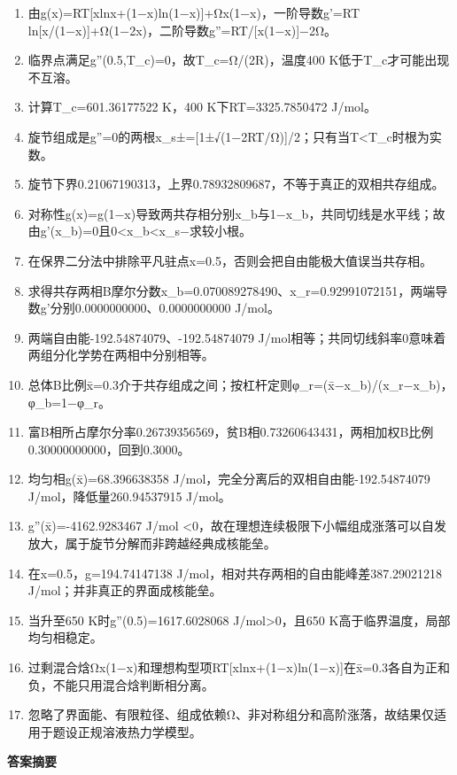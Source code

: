 \documentclass[UTF8,11pt,a4paper]{ctexart}
\begin{document}
\begin{enumerate}
\item 由g(x)=RT[xlnx+(1−x)ln(1−x)]+Ωx(1−x)，一阶导数g'=RT ln[x/(1−x)]+Ω(1−2x)，二阶导数g''=RT/[x(1−x)]−2Ω。
\item 临界点满足g''(0.5,T\_c)=0，故T\_c=Ω/(2R)，温度400 K低于T\_c才可能出现不互溶。
\item 计算T\_c=601.36177522 K，400 K下RT=3325.7850472 J/mol。
\item 旋节组成是g''=0的两根x\_s±=[1±√(1−2RT/Ω)]/2；只有当T<T\_c时根为实数。
\item 旋节下界0.21067190313，上界0.78932809687，不等于真正的双相共存组成。
\item 对称性g(x)=g(1−x)导致两共存相分别x\_b与1−x\_b，共同切线是水平线；故由g'(x\_b)=0且0<x\_b<x\_s−求较小根。
\item 在保界二分法中排除平凡驻点x=0.5，否则会把自由能极大值误当共存相。
\item 求得共存两相B摩尔分数x\_b=0.070089278490、x\_r=0.92991072151，两端导数g'分别0.0000000000、0.0000000000 J/mol。
\item 两端自由能-192.54874079、-192.54874079 J/mol相等；共同切线斜率0意味着两组分化学势在两相中分别相等。
\item 总体B比例x̄=0.3介于共存组成之间；按杠杆定则φ\_r=(x̄−x\_b)/(x\_r−x\_b)，φ\_b=1−φ\_r。
\item 富B相所占摩尔分率0.26739356569，贫B相0.73260643431，两相加权B比例0.30000000000，回到0.3000。
\item 均匀相g(x̄)=68.396638358 J/mol，完全分离后的双相自由能-192.54874079 J/mol，降低量260.94537915 J/mol。
\item g''(x̄)=-4162.9283467 J/mol <0，故在理想连续极限下小幅组成涨落可以自发放大，属于旋节分解而非跨越经典成核能垒。
\item 在x=0.5，g=194.74147138 J/mol，相对共存两相的自由能峰差387.29021218 J/mol；并非真正的界面成核能垒。
\item 当升至650 K时g''(0.5)=1617.6028068 J/mol>0，且650 K高于临界温度，局部均匀相稳定。
\item 过剩混合焓Ωx(1−x)和理想构型项RT[xlnx+(1−x)ln(1−x)]在x̄=0.3各自为正和负，不能只用混合焓判断相分离。
\item 忽略了界面能、有限粒径、组成依赖Ω、非对称组分和高阶涨落，故结果仅适用于题设正规溶液热力学模型。
\end{enumerate}
\noindent\textbf{答案摘要}\par
\end{document}
